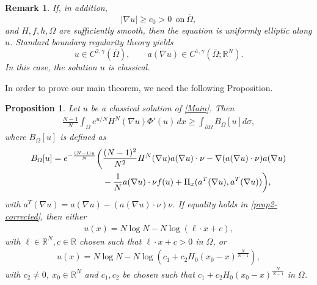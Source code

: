 \documentclass[10pt,a4paper]{amsart}
\numberwithin{equation}{section}
\newtheorem{prop}[thm]{Proposition}
\newtheorem{rmk}[thm]{Remark}
\newcommand{\R}{\mathbb{R}}
\newcommand{\e}{\textup{e}}
\newcommand{\calR}{\mathcal{R}}
\begin{document}
\begin{rmk}
If, in addition,
\[
    |\nabla u|\ge c_0>0 \ \ \text{on}\ \overline\Omega,
\]
and $H,f,h,\Omega$ are sufficiently smooth, then the
equation is uniformly elliptic along $u$. Standard boundary
regularity theory yields
\[
    u\in C^{2,\gamma}(\overline\Omega), \qquad a(\nabla u) \in C^{1,\gamma}(\overline\Omega;\mathbb R^N).
\]
In this case, the solution $u$ is classical.
\end{rmk}


In order to prove our main theorem, we need the following Proposition.

\begin{prop}\label{Prop2}
Let $u$ be a classical solution of \eqref{Main}. Then
\begin{align}\label{prop2-corrected}
        \frac{N-1}{N}\int_{\Omega}e^{u/N}H^N(\nabla u)\Phi'(u)\,dx
        \ge \int_{\partial\Omega}B_\Omega[u]d\sigma,
\end{align}
where $B_\Omega[u]$ is defined as
\begin{align}\label{eq:BOmega}
    B_{\Omega}[u] = \e^{-\frac{(N-1)u}{N}} \bigg( & \frac{(N-1)^2}{N^2} H^N(\nabla u) a(\nabla u) \cdot \nu - \nabla (a(\nabla u) \cdot \nu) a(\nabla u ) \nonumber \\
    & - \frac{1}{N} a(\nabla u) \cdot \nu f(u) + \Pi_x(a^T(\nabla u), a^T(\nabla u) ) \bigg),
\end{align}
with $a^T(\nabla u) = a(\nabla u) - (a(\nabla u) \cdot  \nu) \nu$.
If equality holds in \eqref{prop2-corrected}, then either
    \begin{align}\label{affine}
        u(x) = N \log N - N \log (\ell \cdot x + c),
    \end{align}
    with $\ell \in \R^N, c \in \R$ chosen such that $\ell \cdot x + c > 0 $ in $\Omega$, or
    \begin{align}\label{bubble-form-intro}
        u(x) = N \log N - N \log (c_1 + c_2 H_0(x_0-x)^{\frac{N}{N-1}}),
    \end{align}
    with $c_2 \neq 0$, $x_0 \in \R^N$ and $c_1, c_2$ be chosen such that $c_1 + c_2 H_0(x_0-x)^{\frac{N}{N-1}} $ in $\Omega$.
\end{prop}
\end{document}
